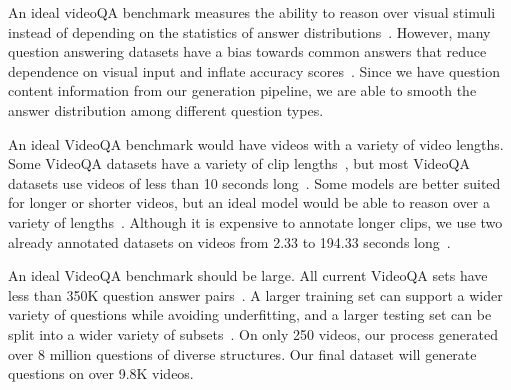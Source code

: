 \documentclass[10pt,twocolumn,letterpaper]{article}
\newcommand{\rak}[1]{{\color{red}{rak: #1}}}
\newcommand{\mgm}[1]{{\color{cyan}{mgm: #1}}}
\begin{document}
An ideal videoQA benchmark measures the ability to reason over visual stimuli instead of depending on the statistics of answer distributions~\cite{vatashsky2020vqa}. However, many question answering datasets have a bias towards common answers that reduce dependence on visual input and inflate accuracy scores~\cite{goyal2017making, hudson2019gqa}. 
Since we have question content information from our generation pipeline, we are able to smooth the answer distribution among different question types. 

An ideal VideoQA benchmark would have videos with a variety of video lengths. Some VideoQA datasets have a variety of clip lengths~\cite{yu2019activitynet,xu2017video}, but most VideoQA datasets use videos of less than 10 seconds long~\cite{jang2017tgif,kim2017deepstory,xu2017video,maharaj2017dataset,zeng2016leveraging,yu2019activitynet}. Some models are better suited for longer or shorter videos, but an ideal model would be able to reason over a variety of lengths~\cite{na2017read,le2020hierarchical}. Although it is expensive to annotate longer clips, we use two already annotated datasets on videos from 2.33 to 194.33 seconds long~\cite{sigurdsson2016hollywood,ji2020action}.

An ideal VideoQA benchmark should be large. All current VideoQA sets have less than 350K question answer pairs~\cite{jang2017tgif,kim2017deepstory,xu2017video,maharaj2017dataset,zeng2016leveraging,yu2019activitynet,lei2018tvqa,tapaswi2016movieqa}. A larger training set can support a wider variety of questions while avoiding underfitting, and a larger testing set can be split into a wider variety of subsets~\cite{maharaj2017dataset}. On only 250 videos, our process generated over 8 million questions of diverse structures. Our final dataset will generate questions on over 9.8K videos.
\end{document}
